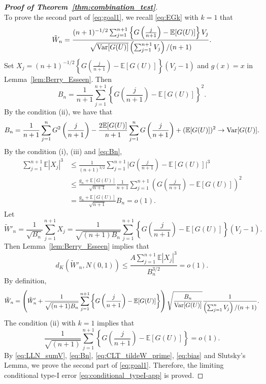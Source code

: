 \documentclass[11pt]{article}
\newcommand{\Var}{\textnormal{Var}}
\def\E{\mathbb{E}}
\begin{document}
\begin{proof}[\textbf{Proof of Theorem~\ref{thm:combination_test}}]
~\\
\noindent To prove the second part of \eqref{eq:goal1}, we recall \eqref{eq:EGk} with $k = 1$ that
\[\tilde{W}_{n} = \frac{(n + 1
)^{-1/2}\sum_{j=1}^{n+1}\left\{G\left(\frac{j}{n+1}\right) - \E[G(U)]\right\}V_{j}}{\sqrt{\Var[G(U)]}\left(\sum_{j=1}^{n+1}V_{j}\right)/(n+1)}.\]
Set $X_j = (n + 1)^{-1/2}\left\{G\left(\frac{j}{n+1}\right) - \E[G(U)]\right\}(V_{j} - 1)$ and $g(x) = x$ in Lemma~\ref{lem:Berry_Esseen}. Then
\[B_{n} = \frac{1}{n+1}\sum_{j=1}^{n+1}\left\{G\left(\frac{j}{n+1}\right) - \E[G(U)]\right\}^2.\]
By the condition (ii), we have that
\begin{equation}\label{eq:Bn}
B_{n} = \frac{1}{n+1}\sum_{j=1}^{n}G^2\left(\frac{j}{n+1}\right) - \frac{2\E[G(U)]}{n+1}\sum_{j=1}^{n}G\left(\frac{j}{n+1}\right) + (\E[G(U)])^2\rightarrow \Var[G(U)].
\end{equation}
By the condition (i), (iii) and \eqref{eq:Bn}, 
\begin{align*}
\sum_{j=1}^{n+1}\E|X_j|^3 
&\le \frac{1}{(n+1)^{3/2}}\sum
_{j=1}^{n+1}\bigg|G\left(\frac{j}{n+1}\right) - \E[G(U)]\bigg|^3\\
&\le \frac{g_{n} + \E[G(U)]}{\sqrt{n+1}}\frac{1}{n+1}\sum_{j=1}^{n+1}\left(G\left(\frac{j}{n+1}\right) - \E[G(U)]\right)^2\\
&= \frac{g_{n} + \E[G(U)]}{\sqrt{n+1}}B_{n} = o(1).
\end{align*}
Let 
\[\tilde{W}'_{n} = \frac{1}{\sqrt{B_n}}\sum_{j=1}^{n+1}X_j = \frac{1}{\sqrt{(n + 1)B_{n}}}\sum_{j=1}^{n+1}\left\{G\left(\frac{j}{n+1}\right) - \E[G(U)]\right\}(V_{j} - 1).\]
Then Lemma~\ref{lem:Berry_Esseen} implies that
\begin{equation}\label{eq:CLT_tildeW_prime}
d_{K}\left(\tilde{W}'_{n}, N(0, 1)\right)\le \frac{A\sum_{j=1}^{n+1}\E|X_j|^3}{B_{n}^{3/2}} = o(1).
\end{equation}
By definition,
\[\tilde{W}_{n} = \left(\tilde{W}'_{n} + \frac{1}{\sqrt{(n + 1)B_{n}}}\sum_{j=1}^{n+1}\left\{G\left(\frac{j}{n+1}\right) - \E[G(U)]\right\}\right)\sqrt{\frac{B_{n}}{\Var[G(U)]}}\frac{1}{\left(\sum_{j=1}^{n}V_{j}\right) / (n+1)}.\]
The condition (ii) with $k = 1$ implies that 
\begin{equation}\label{eq:bias}
\frac{1}{\sqrt{(n + 1)}}\sum_{j=1}^{n+1}\left\{G\left(\frac{j}{n+1}\right)- \E[G(U)]\right\} = o(1).
\end{equation}
By \eqref{eq:LLN_sumV}, \eqref{eq:Bn}, \eqref{eq:CLT_tildeW_prime}, \eqref{eq:bias} and Slutsky's Lemma, we prove the second part of \eqref{eq:goal1}. Therefore, the limiting conditional type-I error \eqref{eq:conditional_typeI-app} is proved. 


\end{proof}
\end{document}
